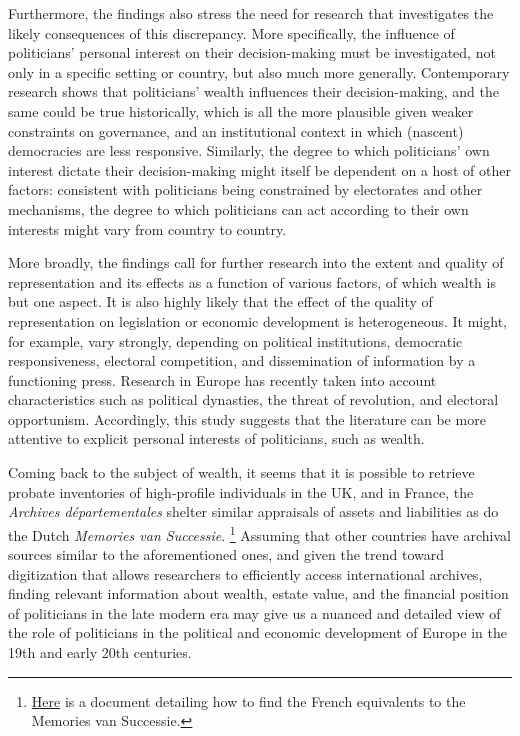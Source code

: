 Furthermore, the findings also stress the need for research that investigates the likely consequences of this discrepancy. More specifically, the influence of politicians' personal interest on their decision-making must be investigated, not only in a specific setting or country, but also much more generally. Contemporary research shows that politicians' wealth influences their decision-making, and the same could be true historically, which is all the more plausible given weaker constraints on governance, and an institutional context in which (nascent) democracies are less responsive. \autocite{tahoun2019personal} Similarly, the  degree to which politicians' own interest dictate their decision-making might itself be dependent on a host of other factors: consistent with politicians being constrained by electorates and other mechanisms, the degree to which politicians can act according to their own interests might vary from country to country. \autocite{djankov2010disclosure}

More broadly, the findings call for further research into the extent and quality of representation and its effects as a function of various factors, of which wealth is but one aspect. It is also highly likely that the effect of the quality of representation on legislation or economic development is heterogeneous. It might, for example, vary strongly, depending on political institutions, democratic responsiveness, electoral competition, and dissemination of information by a functioning press. Research in Europe has recently taken into account characteristics such as political dynasties, the threat of revolution, and electoral opportunism. \autocite{aidt2014workers, oosterlinck2020positive, aidt2019motivates} Accordingly, this study suggests that the literature can be more attentive to explicit personal interests of politicians, such as wealth. 

Coming back to the subject of wealth, it seems that it is possible to retrieve probate inventories of high-profile individuals in the UK, and in France, the \textit{Archives départementales} shelter similar appraisals of assets and liabilities as do the Dutch \textit{Memories van Successie}. \autocite{bottomley2019returns} \footnote{\href{https://archives.cd08.fr/arkotheque/client/ad_ardennes/_depot_arko/articles/1834/tables-des-successions-et-absences-_doc.pdf}{Here} is a document detailing how to find the French equivalents to the Memories van Successie.} Assuming that other countries have archival sources similar to the aforementioned ones, and given the trend toward digitization that allows researchers to efficiently access international archives, finding relevant information about wealth, estate value, and the financial position of politicians in the late modern era may give us a nuanced and detailed view of the role of politicians in the political and economic development of Europe in the 19th and early 20th centuries. 

